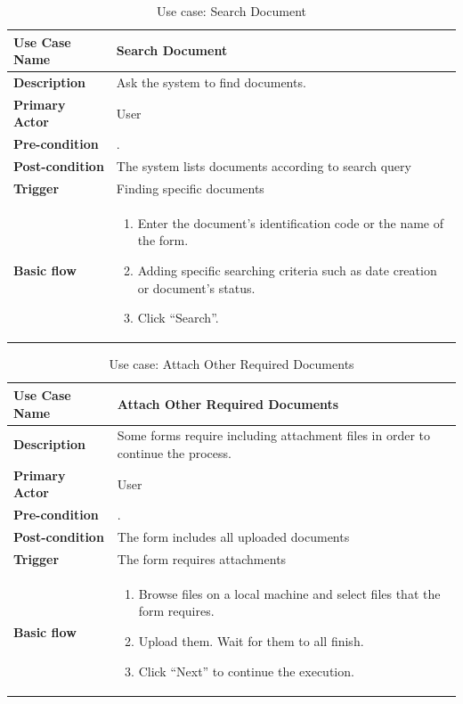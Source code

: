 \begin{table}
	\centering
	\caption{Use case: Search Document}
	\begin{tabular}{|l|L{9cm}|}
		\hline
		\textbf{Use Case Name} & Search Document \\
		\hline
		
		\textbf{Description} & Ask the system to find documents. \\
		\textbf{Primary Actor} & User \\
		\textbf{Pre-condition} & \alreadylogin. \\
		\textbf{Post-condition} & The system lists documents according to search query \\
		\textbf{Trigger} & Finding specific documents \\
		\textbf{Basic flow} & 
		\begin{enumerate}
			\item Enter the document's identification code or the name of the form.
			\item Adding specific searching criteria such as date creation or document's status.
			\item Click \enquote{Search}.
		\end{enumerate} \\
		\hline
	\end{tabular}
\end{table}

\begin{table}
	\centering
	\caption{Use case: Attach Other Required Documents}
	\begin{tabular}{|l|L{9cm}|}
		\hline
		\textbf{Use Case Name} & Attach Other Required Documents \\
		\hline
		
		\textbf{Description} & Some forms require including attachment files in order to continue the process. \\
		\textbf{Primary Actor} & User \\
		\textbf{Pre-condition} & \alreadylogin. \\
		\textbf{Post-condition} & The form includes all uploaded documents \\
		\textbf{Trigger} & The form requires attachments \\
		\textbf{Basic flow} & 
		\begin{enumerate}
			\item Browse files on a local machine and select files that the form requires.
			\item Upload them. Wait for them to all finish.
			\item Click \enquote{Next} to continue the execution.
		\end{enumerate} \\
		\hline
	\end{tabular}
\end{table}

